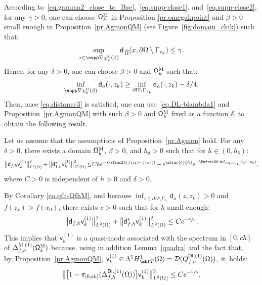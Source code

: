 According to~\eqref{eq.gamma2_close_to_Bzc},~\eqref{eq.supp-close1},
and~\eqref{eq.supp-close2}, for any $\gamma>0$, one can choose
$\mathsf \Omega_k^{\textsc{M}}$ in Proposition \ref{pr.omegakpoint} and
$\beta >0$ small enough in Proposition~\ref{pr.AgmonQM} (see Figure~\ref{fig:domain_chik}) such that:
\[
\sup_{x\in \supp \nabla \chi_k^{\textsc{M}} (\beta)}\mathsf d_{\, \overline \Omega}(x, \partial \Omega \setminus \Gamma_{z_k})\le \gamma.
\]
Hence, for any $\delta>0$, one can choose $\beta >0$ and $\mathsf \Omega_k^{\textsc{M}}$ such that:
\begin{equation}\label{eq.distance3}
\inf_{ \supp \nabla \chi_k^{\textsc{M}} (\beta)} \mathsf d_a(\cdot,z_k)\ge \inf_{ \partial \Omega \setminus \Gamma_{z_k}} \mathsf d_a(\cdot,z_k)-\delta/4.
\end{equation}
Then, once \eqref{eq.distance3} is satisfied, one can
use~\eqref{eq.DL-blambda1} and Proposition~\ref{pr.AgmonQM} with such
$\beta>0$ and $\mathsf \Omega_k^{\textsc{M}}$ fixed as a function $\delta$, to obtain the following result.

\begin{corollary}\label{co.AgmonQM}
\label{co.qfh-QfhM}
Let us assume that the assumptions of Proposition~\ref{pr.Agmon} hold.
For any $\delta>0$,
there exists a domain $\mathsf \Omega_k^{\textsc{M}}$, $\beta>0$, and $h_\delta>0$ such that for $h\in (0,h_\delta)$:
\[
\big \| \mathsf d_{f,h} \mathsf v_k^{(1)} \big \|^{2}_{ L^{2} (\Omega)}+
\big \| \mathsf d^{*}_{f,h} \mathsf v_k^{(1)} \big \|^{2}_{ L^{2} (\Omega)}\!\le\! Ch e^{-\Psfrac 2h(f(z_k)-f(x_0))}+ e^{\sfrac{ \delta}{h}}e^{-\Psfrac 2h \inf_{ \partial \Omega \setminus \Gamma_{z_k}} \mathsf d_a(\cdot,z_k)},
\]
where $C>0$ is independent of $h>0$ and $\delta>0$.\end{corollary}

By Corollary \ref{co.qfh-QfhM}, and because $\inf_{z\in \partial \Omega \setminus \Gamma_{z_k}} \mathsf d_a(z,z_k)>0$ and $f(z_k)>f(x_0)$, there exists $c>0$ such that for $h$ small enough:
\[
\big \| \mathsf d_{f,h} \mathsf v_k^{(1)} \big \|^{2}_{ L^{2} (\Omega)}+
\big \| \mathsf d^{*}_{f,h} \mathsf v_k^{(1)} \big \|^{2}_{ L^{2} (\Omega)}\le C e^{-\sfrac ch}.
\]
This implies that $ \mathsf v_k^{(1)} $ is a quasi-mode
associated with the spectrum in $[0,ch]$ of
$\Delta_{f,h}^{\textsc{M},(1)} (\mathsf \Omega_k^{\textsc{M}})$
because, using in addition Lemma~\ref{quadra} and the fact that, by~Proposition~\ref{pr.AgmonQM}, $\mathsf v_k^{(1)}\in \Lambda^1H^1_{\mbf T}(\Omega)=\mathcal D(Q_{f,h}^{\mathsf{Di},(1)} (\Omega))$, it~holds:
\begin{equation}\label{eq.QM-est-expo-petit}
\bigl \Vert \big [1-\pi_{[0,\mathsf ch]} (\Delta_{f,h}^{\mathsf{Di},(1)} (\Omega))\big] \mathsf v_k^{(1)} \bigr \|^{2}_{ L^{2} (\Omega)} \le C e^{-\sfrac ch}.
\end{equation}

